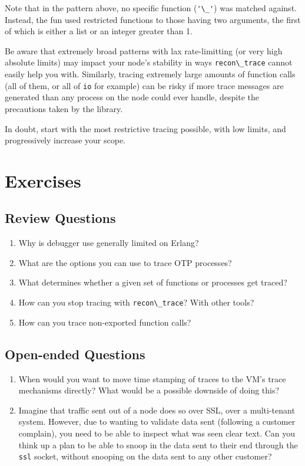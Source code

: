 \documentclass[11pt, oneside]{book}   	%
\newcommand{\module}[1]{\Verb`#1`}
\newcommand{\expression}[1]{\Verb`#1`}
\begin{document}
Note that in the pattern above, no specific function (\expression{'\_'}) was matched against. Instead, the fun used restricted functions to those having two arguments, the first of which is either a list or an integer greater than 1.

Be aware that extremely broad patterns with lax rate-limitting (or very high absolute limits) may impact your node's stability in ways \module{recon\_trace} cannot easily help you with. Similarly, tracing extremely large amounts of function calls (all of them, or all of \module{io} for example) can be risky if more trace messages are generated than any process on the node could ever handle, despite the precautions taken by the library.

In doubt, start with the most restrictive tracing possible, with low limits, and progressively increase your scope.


\section{Exercises}

\subsection{Review Questions}

\begin{enumerate}
	\item Why is debugger use generally limited on Erlang?
	\item What are the options you can use to trace OTP processes?
	\item What determines whether a given set of functions or processes get traced?
	\item How can you stop tracing with \module{recon\_trace}? With other tools?
	\item How can you trace non-exported function calls?
\end{enumerate}

\subsection{Open-ended Questions}

\begin{enumerate}
	\item When would you want to move time stamping of traces to the VM's trace mechanisms directly? What would be a possible downside of doing this?	
	\item Imagine that traffic sent out of a node does so over SSL, over a multi-tenant system. However, due to wanting to validate data sent (following a customer complain), you need to be able to inspect what was seen clear text. Can you think up a plan to be able to snoop in the data sent to their end through the \module{ssl} socket, without snooping on the data sent to any other customer?
\end{enumerate}
\end{document}
